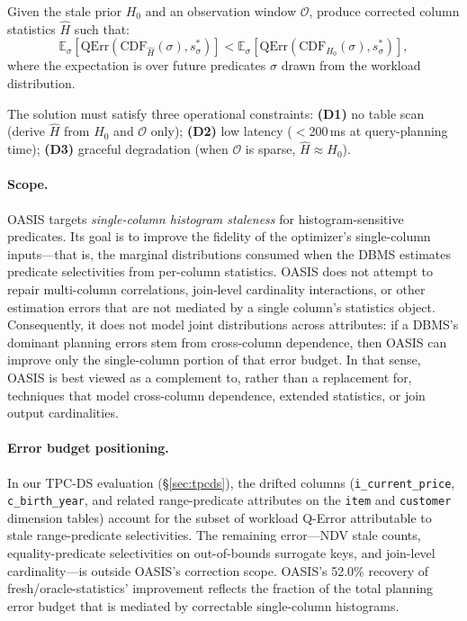 \documentclass[runningheads]{llncs}
\begin{document}
\begin{problem}
Given the stale prior $H_0$ and an observation window $\mathcal{O}$,
produce corrected column statistics $\hat{H}$ such that:
\[
  \mathbb{E}_\sigma\!\left[\mathrm{QErr}\!\left(
      \mathrm{CDF}_{\hat{H}}(\sigma), s^*_\sigma\right)\right]
  < \mathbb{E}_\sigma\!\left[\mathrm{QErr}\!\left(
      \mathrm{CDF}_{H_0}(\sigma), s^*_\sigma\right)\right],
\]
where the expectation is over future predicates $\sigma$ drawn from the
workload distribution.
\end{problem}

The solution must satisfy three operational constraints:
\textbf{(D1)} no table scan (derive $\hat{H}$ from $H_0$ and $\mathcal{O}$ only);
\textbf{(D2)} low latency ($<$200\,ms at query-planning time);
\textbf{(D3)} graceful degradation (when $\mathcal{O}$ is sparse, $\hat{H} \approx H_0$).

\paragraph{Scope.}
OASIS targets \emph{single-column histogram staleness} for histogram-sensitive
predicates. Its goal is to improve the fidelity of the optimizer's
single-column inputs---that is, the marginal distributions consumed when the
DBMS estimates predicate selectivities from per-column statistics. OASIS does
not attempt to repair multi-column correlations, join-level cardinality
interactions, or other estimation errors that are not mediated by a single
column's statistics object. Consequently, it does not model joint
distributions across attributes: if a DBMS's dominant planning errors stem from
cross-column dependence, then OASIS can improve only the single-column portion
of that error budget. In that sense, OASIS is best viewed as a complement to,
rather than a replacement for, techniques that model cross-column dependence,
extended statistics, or join output cardinalities.
\paragraph{Error budget positioning.}
In our TPC-DS evaluation (\S\ref{sec:tpcds}), the drifted columns
(\texttt{i\_current\_price}, \texttt{c\_birth\_year}, and related
range-predicate attributes on the \texttt{item} and \texttt{customer}
dimension tables) account for the subset of workload Q-Error attributable
to stale range-predicate selectivities. The remaining error---NDV stale
counts, equality-predicate selectivities on out-of-bounds surrogate keys,
and join-level cardinality---is outside OASIS's correction scope. OASIS's
52.0\% recovery of fresh/oracle-statistics' improvement reflects the fraction of the
total planning error budget that is mediated by correctable single-column
histograms.
\end{document}
